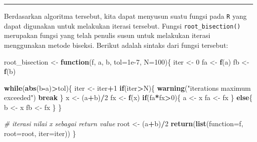 \documentclass[
]{book}
\newenvironment{Shaded}{\begin{snugshade}}{\end{snugshade}}
\newcommand{\AttributeTok}[1]{\textcolor[rgb]{0.13,0.29,0.53}{#1}}
\newcommand{\CommentTok}[1]{\textcolor[rgb]{0.56,0.35,0.01}{\textit{#1}}}
\newcommand{\ControlFlowTok}[1]{\textcolor[rgb]{0.13,0.29,0.53}{\textbf{#1}}}
\newcommand{\DecValTok}[1]{\textcolor[rgb]{0.00,0.00,0.81}{#1}}
\newcommand{\FloatTok}[1]{\textcolor[rgb]{0.00,0.00,0.81}{#1}}
\newcommand{\FunctionTok}[1]{\textcolor[rgb]{0.13,0.29,0.53}{\textbf{#1}}}
\newcommand{\NormalTok}[1]{#1}
\newcommand{\OtherTok}[1]{\textcolor[rgb]{0.56,0.35,0.01}{#1}}
\newcommand{\SpecialCharTok}[1]{\textcolor[rgb]{0.81,0.36,0.00}{\textbf{#1}}}
\newcommand{\StringTok}[1]{\textcolor[rgb]{0.31,0.60,0.02}{#1}}
\theoremstyle{definition}
\theoremstyle{definition}
\theoremstyle{definition}
\theoremstyle{definition}
\theoremstyle{remark}
\begin{document}
\begin{center}\rule{0.5\linewidth}{0.5pt}\end{center}

Berdasarkan algoritma tersebut, kita dapat menyusun suatu fungsi pada \texttt{R} yang dapat digunakan untuk melakukan iterasi tersebut. Fungsi \texttt{root\_bisection()} merupakan fungsi yang telah penulis susun untuk melakukan iterasi menggunakan metode biseksi. Berikut adalah sintaks dari fungsi tersebut:

\begin{Shaded}
\begin{Highlighting}[]
\NormalTok{root\_bisection }\OtherTok{\textless{}{-}} \ControlFlowTok{function}\NormalTok{(f, a, b, }\AttributeTok{tol=}\FloatTok{1e{-}7}\NormalTok{, }\AttributeTok{N=}\DecValTok{100}\NormalTok{)\{}
\NormalTok{  iter }\OtherTok{\textless{}{-}} \DecValTok{0}
\NormalTok{  fa }\OtherTok{\textless{}{-}} \FunctionTok{f}\NormalTok{(a)}
\NormalTok{  fb }\OtherTok{\textless{}{-}} \FunctionTok{f}\NormalTok{(b)}
  
  \ControlFlowTok{while}\NormalTok{(}\FunctionTok{abs}\NormalTok{(b}\SpecialCharTok{{-}}\NormalTok{a)}\SpecialCharTok{\textgreater{}}\NormalTok{tol)\{}
\NormalTok{    iter }\OtherTok{\textless{}{-}}\NormalTok{ iter}\SpecialCharTok{+}\DecValTok{1}
    \ControlFlowTok{if}\NormalTok{(iter}\SpecialCharTok{\textgreater{}}\NormalTok{N)\{}
      \FunctionTok{warning}\NormalTok{(}\StringTok{"iterations maximum exceeded"}\NormalTok{)}
      \ControlFlowTok{break}
\NormalTok{    \}}
\NormalTok{    x }\OtherTok{\textless{}{-}}\NormalTok{ (a}\SpecialCharTok{+}\NormalTok{b)}\SpecialCharTok{/}\DecValTok{2}
\NormalTok{    fx }\OtherTok{\textless{}{-}} \FunctionTok{f}\NormalTok{(x)}
    \ControlFlowTok{if}\NormalTok{(fa}\SpecialCharTok{*}\NormalTok{fx}\SpecialCharTok{\textgreater{}}\DecValTok{0}\NormalTok{)\{}
\NormalTok{      a }\OtherTok{\textless{}{-}}\NormalTok{ x}
\NormalTok{      fa }\OtherTok{\textless{}{-}}\NormalTok{ fx}
\NormalTok{    \} }\ControlFlowTok{else}\NormalTok{\{}
\NormalTok{      b }\OtherTok{\textless{}{-}}\NormalTok{ x}
\NormalTok{      fb }\OtherTok{\textless{}{-}}\NormalTok{ fx}
\NormalTok{    \}}
\NormalTok{  \}}
  
  \CommentTok{\# iterasi nilai x sebagai return value}
\NormalTok{  root }\OtherTok{\textless{}{-}}\NormalTok{ (a}\SpecialCharTok{+}\NormalTok{b)}\SpecialCharTok{/}\DecValTok{2}
  \FunctionTok{return}\NormalTok{(}\FunctionTok{list}\NormalTok{(}\StringTok{\textasciigrave{}}\AttributeTok{function}\StringTok{\textasciigrave{}}\OtherTok{=}\NormalTok{f, }\AttributeTok{root=}\NormalTok{root, }\AttributeTok{iter=}\NormalTok{iter))}
\NormalTok{\}}
\end{Highlighting}
\end{Shaded}
\end{document}
